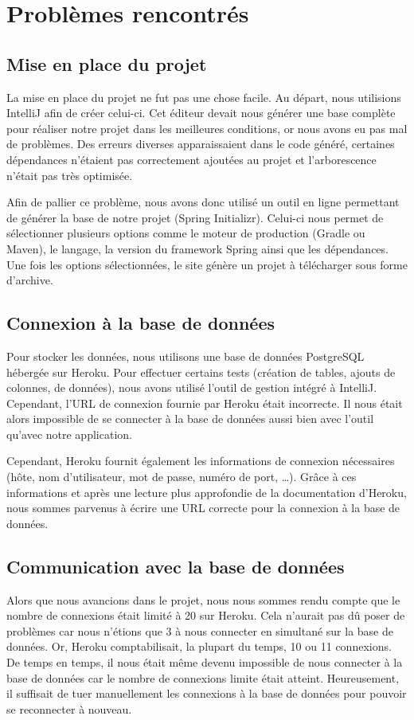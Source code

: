 \section{Problèmes rencontrés}
	
	\subsection{Mise en place du projet}
	La mise en place du projet ne fut pas une chose facile. Au départ, nous utilisions IntelliJ afin de créer celui-ci. Cet éditeur devait nous générer une base complète pour réaliser notre projet dans les meilleures conditions, or nous avons eu pas mal de problèmes. Des erreurs diverses apparaissaient dans le code généré, certaines dépendances n'étaient pas correctement ajoutées au projet et l'arborescence n'était pas très optimisée.
	
	Afin de pallier ce problème, nous avons donc utilisé un outil en ligne permettant de générer la base de notre projet (Spring Initializr). Celui-ci nous permet de sélectionner plusieurs options comme le moteur de production (Gradle ou Maven), le langage, la version du framework Spring ainsi que les dépendances. Une fois les options sélectionnées, le site génère un projet à télécharger sous forme d'archive.
	
	\subsection{Connexion à la base de données}
	Pour stocker les données, nous utilisons une base de données PostgreSQL hébergée sur Heroku. Pour effectuer certains tests (création de tables, ajouts de colonnes, de données), nous avons utilisé l'outil de gestion intégré à IntelliJ. Cependant, l'URL de connexion fournie par Heroku était incorrecte. Il nous était alors impossible de se connecter à la base de données aussi bien avec l'outil qu'avec notre application.
	
	Cependant, Heroku fournit également les informations de connexion nécessaires (hôte, nom d'utilisateur, mot de passe, numéro de port, \dots). Grâce à ces informations et après une lecture plus approfondie de la documentation d'Heroku, nous sommes parvenus à écrire une URL correcte pour la connexion à la base de données.
	
	\subsection{Communication avec la base de données}
	Alors que nous avancions dans le projet, nous nous sommes rendu compte que le nombre de connexions était limité à 20 sur Heroku. Cela n'aurait pas dû poser de problèmes car nous n'étions que 3 à nous connecter en simultané sur la base de données. Or, Heroku comptabilisait, la plupart du temps, 10 ou 11 connexions. De temps en temps, il nous était même devenu impossible de nous connecter à la base de données car le nombre de connexions limite était atteint.
	Heureusement, il suffisait de tuer manuellement les connexions à la base de données pour pouvoir se reconnecter à nouveau.
	
